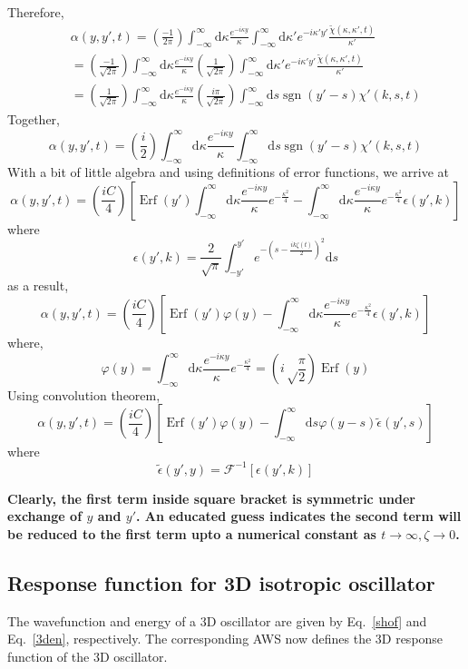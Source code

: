 \documentclass{article}
\DeclareMathOperator{\sign}{sgn}
\newcommand{\eq}{\begin{equation}}
\newcommand{\qe}{\end{equation}}
\DeclareMathOperator{\erf}{Erf}
\newcommand{\lp}{\left(}
\newcommand{\rp}{\right)}
\newcommand{\diff}{\mathrm{d}}
\begin{document}
Therefore, 
\begin{eqnarray}
&&\alpha(y, y', t) = \lp \frac{-1}{2\pi}\rp \int_{-\infty}^{\infty} \diff \kappa \frac{e^{-i \kappa y}}{\kappa}\int_{-\infty}^{\infty} \diff \kappa' e^{-i \kappa' y'} \frac{\tilde{\chi}(\kappa, \kappa', t)}{\kappa'}\\
     && =\lp \frac{-1}{\sqrt{2\pi}}\rp \int_{-\infty}^{\infty} \diff \kappa \frac{e^{-i \kappa y}}{\kappa}\lp \frac{1}{\sqrt{2\pi}}\rp\int_{-\infty}^{\infty} \diff \kappa' e^{-i \kappa' y'} \frac{\tilde{\chi}(\kappa, \kappa', t)}{\kappa'}\\
 &&= \lp \frac{1}{\sqrt{2\pi}}\rp \int_{-\infty}^{\infty} \diff \kappa \frac{e^{-i \kappa y}}{\kappa} \lp \frac{i \pi}{\sqrt{2\pi}}\rp \int_{-\infty}^{\infty} \diff s \sign(y'-s) \chi'(k, s, t)
\end{eqnarray}
Together, 
\eq
\alpha(y, y', t) = \lp \frac{i}{2}\rp \int_{-\infty}^{\infty} \diff \kappa \frac{e^{-i \kappa y}}{\kappa}  \int_{-\infty}^{\infty} \diff s \sign(y'-s) \chi'(k, s, t)
\qe
With a bit of little algebra and using definitions of error functions, we arrive at 
\eq
\alpha(y, y', t) = \lp \frac{iC}{4}\rp \left[ \erf(y') \int_{-\infty}^{\infty} \diff \kappa \frac{e^{-i \kappa y}}{\kappa} e^{-\frac{\kappa^2}{4}}  - \int_{-\infty}^{\infty} \diff \kappa \frac{e^{-i \kappa y}}{\kappa} e^{-\frac{\kappa^2}{4}} \epsilon \lp y',k \rp \right]
\qe
where 
\eq
\epsilon \lp y', k\rp = \frac{2}{\sqrt{\pi}} \int_{-y'}^{y'} e^{-(s-\frac{ik\zeta(t)}{2})^{2}} \diff s 
\qe
as a result,
\eq
\alpha(y, y', t) = \lp \frac{iC}{4}\rp \left[ \erf(y') \varphi(y) - \int_{-\infty}^{\infty} \diff \kappa \frac{e^{-i \kappa y}}{\kappa} e^{-\frac{\kappa^2}{4}} \epsilon \lp y',k \rp \right]
\qe
where,
\eq
\varphi(y) = \int_{-\infty}^{\infty} \diff \kappa \frac{e^{-i \kappa y}}{\kappa} e^{-\frac{\kappa^2}{4}}=\lp {i\sqrt \frac{\pi}{2}} \rp \erf(y)
\qe
Using convolution theorem, 
\eq
\alpha(y, y', t) = \lp \frac{iC}{4}\rp \left[ \erf(y') \varphi(y) - \int_{-\infty}^{\infty} \diff s \varphi(y-s) \tilde{\epsilon} (y',s) \right]
\qe
where 
\eq
\tilde{\epsilon}(y', y) =\mathcal{F}^{-1}[\epsilon(y', k)]
\qe

\textbf{Clearly, the first term inside square bracket is symmetric under exchange of $y$ and $y'$. An educated guess indicates the second term will be reduced to the first term upto a numerical constant as $t \to \infty, \zeta \to 0$. }

\subsection{Response function for 3D isotropic oscillator}
 The wavefunction and energy of a 3D oscillator are given by Eq.~\eqref{shof} and Eq.~\eqref{3den}, respectively. The corresponding AWS now defines the 3D response function of the 3D oscillator. \\
\end{document}
